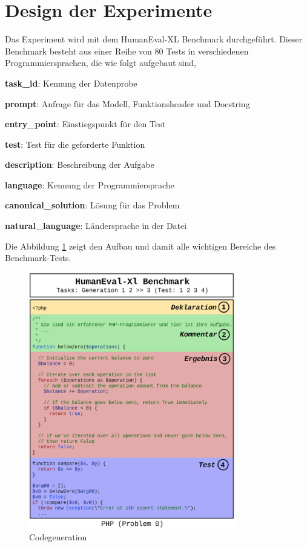 

\section{Design der Experimente}
Das Experiment wird mit dem HumanEval-XL Benchmark durchgeführt. Dieser Benchmark besteht aus einer Reihe von 80 Tests in verschiedenen Programmiersprachen, die wie folgt aufgebaut sind,

\begin{myitemize}
	\item \textbf{task\_id}: Kennung der Datenprobe
	\item \textbf{prompt}: Anfrage für das Modell, Funktionsheader und Docstring
	\item \textbf{entry\_point}: Einstiegspunkt für den Test
	\item \textbf{test}: Test für die geforderte Funktion
	\item \textbf{description}: Beschreibung der Aufgabe
	\item \textbf{language}: Kennung der Programmiersprache
	\item \textbf{canonical\_solution}: Lösung für das Problem
	\item \textbf{natural\_language}: Ländersprache in der Datei
\end{myitemize}

Die Abbildung \ref{img:code_generation_humaneval} zeigt den Aufbau und damit alle wichtigen Bereiche des Benchmark-Tests.\vspace{0.2cm}

\begin{figure}[!ht]
	\includegraphics[width=0.8\textwidth]{content/chapter_intruduction/images/code_generation_humaneval_x.eps}
	\centering
	\caption{Codegeneration}
	\label{img:code_generation_humaneval}
\end{figure}


